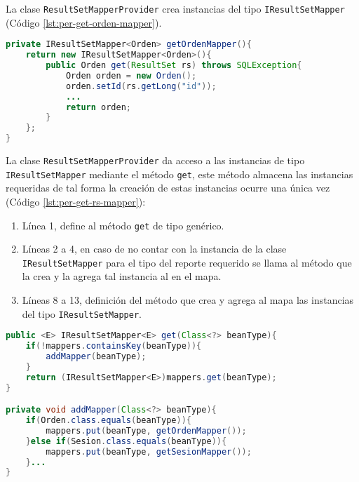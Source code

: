 La clase \texttt{ResultSetMapperProvider} crea instancias del tipo \texttt{IResultSetMapper} (Código \ref{lst:per-get-orden-mapper}).
\begin{lstlisting}[language=Java, caption={Creación de un objeto del tipo \texttt{IResultSetMapper}.}, captionpos=b, label={lst:per-get-orden-mapper}]
private IResultSetMapper<Orden> getOrdenMapper(){
	return new IResultSetMapper<Orden>(){
		public Orden get(ResultSet rs) throws SQLException{
			Orden orden = new Orden();
			orden.setId(rs.getLong("id"));
			...
			return orden;
		}
	};
}
\end{lstlisting}

La clase \texttt{ResultSetMapperProvider} da acceso a las instancias de tipo \texttt{IResultSetMapper} mediante el método \texttt{get}, este método almacena las instancias requeridas de tal forma la creación de estas instancias ocurre una única vez (Código \ref{lst:per-get-rs-mapper}):
\begin{enumerate}
	\item Línea 1, define al método \texttt{get} de tipo genérico.
	\item Líneas 2 a 4, en caso de no contar con la instancia de la clase \texttt{IResultSetMapper} para el tipo del reporte requerido se llama al método que la crea y la agrega tal instancia al en el mapa.
	\item Líneas 8 a 13, definición del método que crea y agrega al mapa las instancias del tipo \texttt{IResultSetMapper}.
\end{enumerate}

\pagebreak

\begin{lstlisting}[language=Java, caption={Selección de instancias de IResultSetMapper.}, captionpos=b, label={lst:per-get-rs-mapper}]
public <E> IResultSetMapper<E> get(Class<?> beanType){
	if(!mappers.containsKey(beanType)){
		addMapper(beanType);
	}
	return (IResultSetMapper<E>)mappers.get(beanType);
}

private void addMapper(Class<?> beanType){
	if(Orden.class.equals(beanType)){
		mappers.put(beanType, getOrdenMapper());
	}else if(Sesion.class.equals(beanType)){
		mappers.put(beanType, getSesionMapper());
	}...
}
\end{lstlisting}

